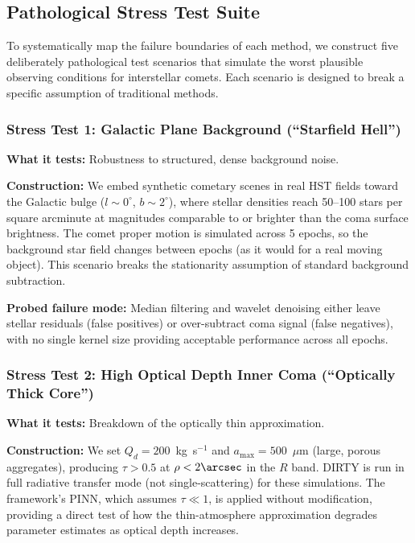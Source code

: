 \documentclass[preprint2]{aastex631}
\begin{document}
\subsection{Pathological Stress Test Suite}\label{sec:stress}

To systematically map the failure boundaries of each method, we construct five deliberately pathological test scenarios that simulate the worst plausible observing conditions for interstellar comets. Each scenario is designed to break a specific assumption of traditional methods.

\subsubsection{Stress Test 1: Galactic Plane Background (``Starfield Hell'')}

\textbf{What it tests:} Robustness to structured, dense background noise.

\textbf{Construction:} We embed synthetic cometary scenes in real HST fields toward the Galactic bulge ($l \sim 0^\circ$, $b \sim 2^\circ$), where stellar densities reach 50--100 stars per square arcminute at magnitudes comparable to or brighter than the coma surface brightness. The comet proper motion is simulated across 5 epochs, so the background star field changes between epochs (as it would for a real moving object). This scenario breaks the stationarity assumption of standard background subtraction.

\textbf{Probed failure mode:} Median filtering and wavelet denoising either leave stellar residuals (false positives) or over-subtract coma signal (false negatives), with no single kernel size providing acceptable performance across all epochs.

\subsubsection{Stress Test 2: High Optical Depth Inner Coma (``Optically Thick Core'')}

\textbf{What it tests:} Breakdown of the optically thin approximation.

\textbf{Construction:} We set $Q_d = 200$~kg~s$^{-1}$ and $a_{\max} = 500$~$\mu$m (large, porous aggregates), producing $\tau > 0.5$ at $\rho < 2\arcsec$ in the $R$ band. DIRTY is run in full radiative transfer mode (not single-scattering) for these simulations. The framework's PINN, which assumes $\tau \ll 1$, is applied without modification, providing a direct test of how the thin-atmosphere approximation degrades parameter estimates as optical depth increases.
\end{document}
